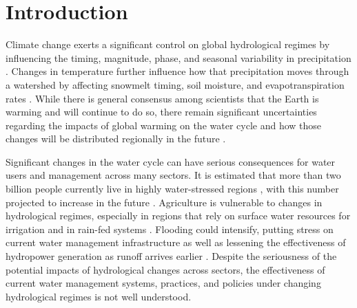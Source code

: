 \documentclass[11pt,letterpaper]{article}
\begin{document}








\section{Introduction}
Climate change exerts a significant control on global hydrological regimes by influencing the timing, magnitude, phase, and seasonal variability in precipitation \citep{Mote:2005bv,Regonda:2005bl,Knowles:2006jc,Haddeland:2014kx,Deb:2018tj}. Changes in temperature further influence how that precipitation moves through a watershed by affecting snowmelt timing, soil moisture, and evapotranspiration rates \citep{Barnett:2005ci,Li:2017jn}. While there is general consensus among scientists that the Earth is warming and will continue to do so, there remain significant uncertainties regarding the impacts of global warming on the water cycle and how those changes will be distributed regionally in the future \citep{Huntington:2006tl,Turral:2011uj}.

Significant changes in the water cycle can have serious consequences for water users and management across many sectors. It is estimated that more than two billion people currently live in highly water-stressed regions \citep{Oki:2006cu}, with this number projected to increase in the future \citep{Schewe:2014er}. Agriculture is vulnerable to changes in hydrological regimes, especially in regions that rely on surface water resources for irrigation and in rain-fed systems \citep{Turral:2011uj}. Flooding could intensify, putting stress on current water management infrastructure as well as lessening the effectiveness of hydropower generation as runoff arrives earlier \citep{Markoff:2008tk}. Despite the seriousness of the potential impacts of hydrological changes across sectors, the effectiveness of current water management systems, practices, and policies under changing hydrological regimes is not well understood.
\end{document}

